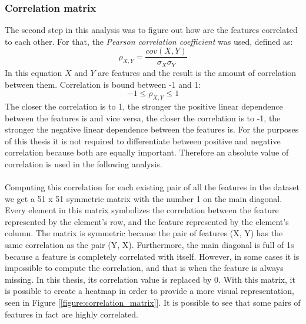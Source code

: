 \documentclass[11pt]{article}
\begin{document}
      \subsubsection{Correlation matrix}
        The second step in this analysis was to figure out how are the features correlated to each other. For that, the {\it Pearson correlation coefficient} was used, defined as: \cite{correlation}
        \begin{equation}
          \rho_{X, Y} = \frac{cov(X, Y)}{\sigma_X \sigma_Y}
        \end{equation}
        In this equation $X$ and $Y$ are features and the result is the amount of correlation between them. Correlation is bound between -1 and 1: \cite{correlation}
        \begin{equation}
          -1 \leq \rho_{X, Y} \leq 1
        \end{equation}
        The closer the correlation is to 1, the stronger the positive linear dependence between the features is and vice versa, the closer the correlation is to -1, the stronger the negative linear dependence between the features is. For the purposes of this thesis it is not required to differentiate between positive and negative correlation because both are equally important. Therefore an absolute value of correlation is used in the following analysis.
        \\~\\
        Computing this correlation for each existing pair of all the features in the dataset we get a 51 x 51 symmetric matrix with the number 1 on the main diagonal. Every element in this matrix symbolizes the correlation between the feature represented by the element's row, and the feature represented by the element's column. The matrix is symmetric because the pair of features (X, Y) has the same correlation as the pair (Y, X). Furthermore, the main diagonal is full of 1s because a feature is completely correlated with itself. However, in some cases it is impossible to compute the correlation, and that is when the feature is always missing. In this thesis, its correlation value is replaced by 0. With this matrix, it is possible to create a heatmap in order to provide a more visual representation, seen in Figure [\ref{figure:correlation_matrix}]. It is possible to see that some pairs of features in fact are highly correlated.
\end{document}
